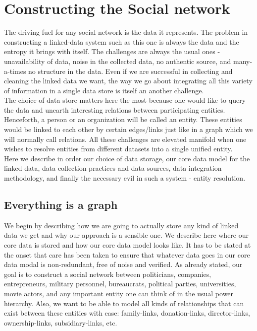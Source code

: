 \chapter{Constructing the Social network}

The driving fuel for any social network is the data it represents. The problem in constructing a linked-data system such as this one is always the data and the entropy it brings with itself. The challenges are always the usual ones - unavailability of data, noise in the collected data, no authentic source, and many-a-times no structure in the data. Even if we are successful in collecting and cleaning the linked data we want, the way we go about integrating all this variety of information in a single data store is itself an another challenge. \\

The choice of data store matters here the most because one would like to query the data and unearth interesting relations between participating entities. Henceforth, a person or an organization will be called an entity. These entities would be linked to each other by certain edges/links just like in a graph which we will normally call relations. All these challenges are elevated manifold when one wishes to resolve entities from different datasets into a single unified entity. \\

Here we describe in order our choice of data storage, our core data model for the linked data, data collection practices and data sources, data integration methodology, and finally the necessary evil in such a system -  entity resolution. \\

\section{Everything is a graph}
\label{datamodel}
We begin by describing how we are going to actually store any kind of linked data we get and why our approach is a sensible one. We describe here where our core data is stored and how our core data model looks like. It has to be stated at the onset that care has been taken to ensure that
whatever data goes in our core data modal is non-redundant, free of noise and verified. As already stated, our goal is to construct a social network between politicians, companies, entrepreneurs, military personnel, bureaucrats, political parties, universities, movie actors, and any important entity one can think of in the usual power hierarchy. Also, we want to be able to model all kinds of relationships that can exist between these entities with ease: family-links, donation-links, director-links, ownership-links, subsidiary-links, etc. \\

